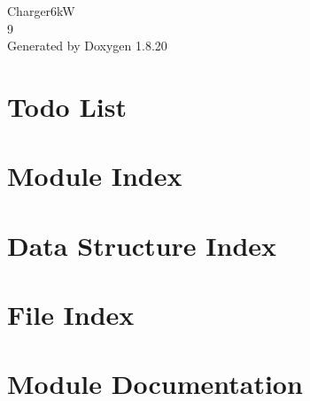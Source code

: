 \let\mypdfximage\pdfximage\def\pdfximage{\immediate\mypdfximage}\documentclass[twoside]{book}
\newcommand{\+}{\discretionary{\mbox{\scriptsize$\hookleftarrow$}}{}{}}
\newcommand{\clearemptydoublepage}{%
  \newpage{\pagestyle{empty}\cleardoublepage}%
}
\begin{document}
\hypersetup{pageanchor=false,
             bookmarksnumbered=true,
             pdfencoding=unicode
            }
\begin{titlepage}
\vspace*{7cm}
\begin{center}%
{\Large Charger6kW \\[1ex]\large 9 }\\
\vspace*{1cm}
{\large Generated by Doxygen 1.8.20}\\
\end{center}
\end{titlepage}
\clearemptydoublepage
{}
\tableofcontents
\clearemptydoublepage
{}
\hypersetup{pageanchor=true}

\chapter{Todo List}
\label{todo}

\chapter{Module Index}

\chapter{Data Structure Index}

\chapter{File Index}

\chapter{Module Documentation}

\end{document}
